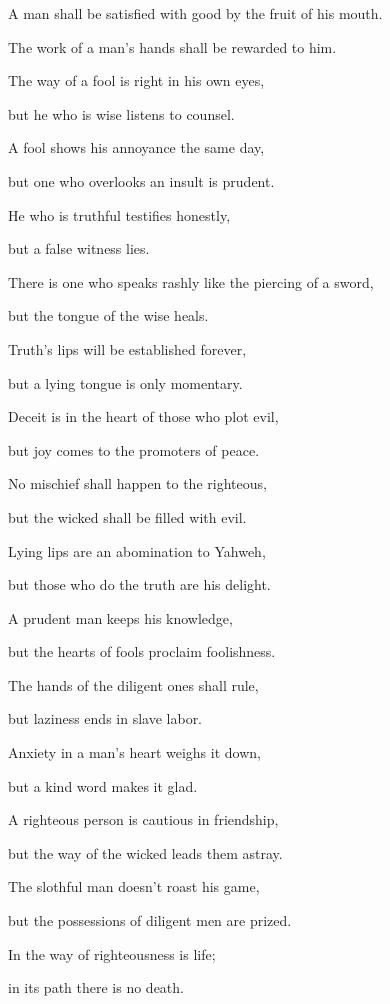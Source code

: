 {\par }{\Q {}A man shall be satisfied with good by the fruit of his mouth.
\par }{\QB The work of a man’s hands shall be rewarded to him.
\par }{\Q {}The way of a fool is right in his own eyes,
\par }{\QB but he who is wise listens to counsel.
\par }{\Q {}A fool shows his annoyance the same day,
\par }{\QB but one who overlooks an insult is prudent.
\par }{\Q {}He who is truthful testifies honestly,
\par }{\QB but a false witness lies.
\par }{\Q {}There is one who speaks rashly like the piercing of a sword,
\par }{\QB but the tongue of the wise heals.
\par }{\Q {}Truth’s lips will be established forever,
\par }{\QB but a lying tongue is only momentary.
\par }{\Q {}Deceit is in the heart of those who plot evil,
\par }{\QB but joy comes to the promoters of peace.
\par }{\Q {}No mischief shall happen to the righteous,
\par }{\QB but the wicked shall be filled with evil.
\par }{\Q {}Lying lips are an abomination to Yahweh,
\par }{\QB but those who do the truth are his delight.
\par }{\Q {}A prudent man keeps his knowledge,
\par }{\QB but the hearts of fools proclaim foolishness.
\par }{\Q {}The hands of the diligent ones shall rule,
\par }{\QB but laziness ends in slave labor.
\par }{\Q {}Anxiety in a man’s heart weighs it down,
\par }{\QB but a kind word makes it glad.
\par }{\Q {}A righteous person is cautious in friendship,
\par }{\QB but the way of the wicked leads them astray.
\par }{\Q {}The slothful man doesn’t roast his game,
\par }{\QB but the possessions of diligent men are prized.
\par }{\Q {}In the way of righteousness is life;
\par }{\QB in its path there is no death.

}
